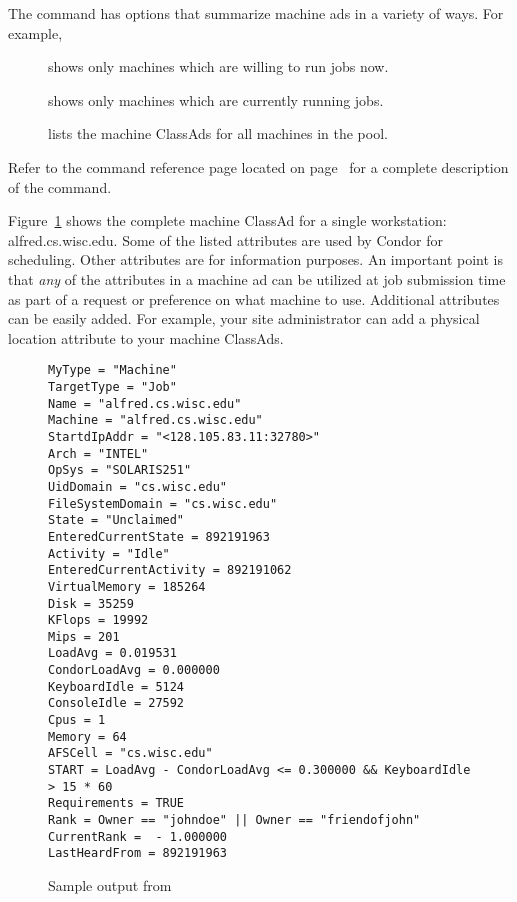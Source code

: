 The  command has options that summarize machine ads 
in a variety of ways.
For example,
\begin{description}
\item[] shows only machines which are
willing to run jobs now. 
\item[] shows only machines
which are currently running jobs.  
\item[] lists the machine ClassAds for all machines
in the pool.
\end{description}

Refer to the  command 
reference page located on page~\pageref{man-condor-status}
for a complete description of the  command.

Figure~\ref{fig:CondorStatusL} shows the complete machine ClassAd
for a single workstation: alfred.cs.wisc.edu. Some of the listed
attributes are used by
Condor for scheduling. Other attributes are for information purposes.
An important point is that \emph{any} of the attributes in a
machine ad can be utilized at job submission time as part of a request
or preference on what machine to use. Additional attributes
can be easily added. For example, your site administrator can
add a physical location attribute to your machine ClassAds.

%
%
%
\begin{center}
\begin{figure}
\CondorVerySmall
\begin{verbatim}
MyType = "Machine"
TargetType = "Job"
Name = "alfred.cs.wisc.edu"
Machine = "alfred.cs.wisc.edu"
StartdIpAddr = "<128.105.83.11:32780>"
Arch = "INTEL"
OpSys = "SOLARIS251"
UidDomain = "cs.wisc.edu"
FileSystemDomain = "cs.wisc.edu"
State = "Unclaimed"
EnteredCurrentState = 892191963
Activity = "Idle"
EnteredCurrentActivity = 892191062
VirtualMemory = 185264
Disk = 35259
KFlops = 19992
Mips = 201
LoadAvg = 0.019531
CondorLoadAvg = 0.000000
KeyboardIdle = 5124
ConsoleIdle = 27592
Cpus = 1
Memory = 64
AFSCell = "cs.wisc.edu"
START = LoadAvg - CondorLoadAvg <= 0.300000 && KeyboardIdle > 15 * 60
Requirements = TRUE
Rank = Owner == "johndoe" || Owner == "friendofjohn" 
CurrentRank =  - 1.000000
LastHeardFrom = 892191963
\end{verbatim}
\normalsize
\caption{\label{fig:CondorStatusL}Sample output from }
\end{figure}
\end{center}


